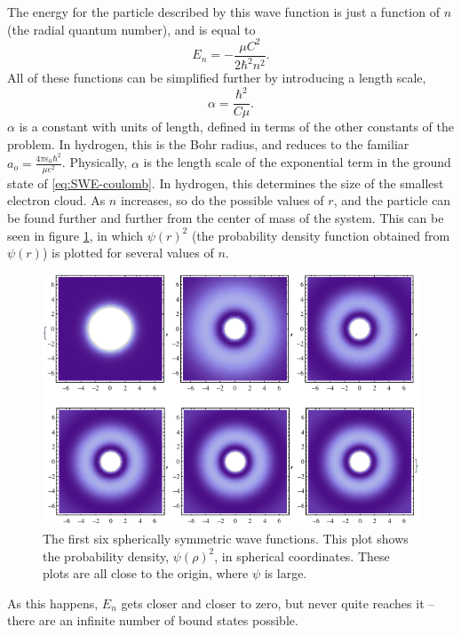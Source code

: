 \documentclass[12pt,twoside]{reedthesis}
\newcommand{\eqn}[1]{\begin{equation}#1\end{equation}}
\newcommand{\fig}[2]{\begin{figure}\begin{center}#1\end{center}#2\end{figure}}
\begin{document}
The energy for the particle described by this wave function is just a function of $n$ (the radial quantum number), and is equal to
\eqn{
E_n = -\frac{\mu C^2}{2\hbar^2 n^2}\mbox{.}
}
All of these functions can be simplified further by introducing a length scale, 
\eqn{
\alpha = \frac{\hbar^2}{C \mu}\mbox{.}
\label{eq:bohrradius}
}
$\alpha$ is a constant with units of length, defined in terms of the other constants of the problem. In hydrogen, this is the Bohr radius, and reduces to the familiar $a_o = \frac{4\pi \epsilon_0 \hbar^2}{\mu e^2}$. Physically, $\alpha$ is the length scale of the exponential term in the ground state of \eqref{eq:SWE-coulomb}. In hydrogen, this determines the size of the smallest electron cloud. As $n$ increases, so do the possible values of $r$, and the particle can be found further and further from the center of mass of the system. This can be seen in figure \ref{fig:hfuncs}, in which $\psi(r)^2$ (the probability density function obtained from $\psi(r)$) is plotted for several values of $n$.
\fig{
\includegraphics[scale=0.7]{Figures/densityplots}
}{
\caption{The first six spherically symmetric wave functions. This plot shows the probability density, $\psi(\rho)^2$, in spherical coordinates. These plots are all close to the origin, where $\psi$ is large.}
\label{fig:hfuncs}
}
As this happens, $E_n$ gets closer and closer to zero, but never quite reaches it -- there are an infinite number of bound states possible.
\end{document}
